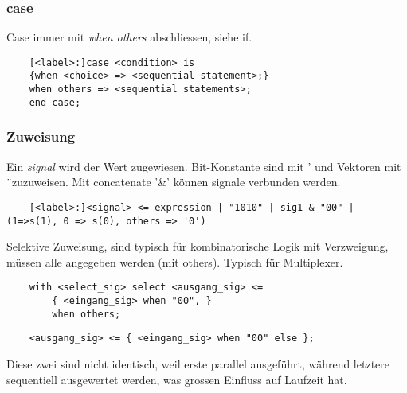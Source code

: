 \subsubsection{case}
Case immer mit \textit{when others} abschliessen, siehe if.
\begin{lstlisting}
	[<label>:]case <condition> is
	{when <choice> => <sequential statement>;}
	when others => <sequential statements>;
	end case;
\end{lstlisting}

\subsubsection{Zuweisung}
Ein \textit{signal} wird der Wert zugewiesen. Bit-Konstante sind mit ' und Vektoren mit \"\ zuzuweisen. Mit concatenate '\&' können signale verbunden werden. 
\begin{lstlisting}
	[<label>:]<signal> <= expression | "1010" | sig1 & "00" | (1=>s(1), 0 => s(0), others => '0') 
\end{lstlisting}
Selektive Zuweisung, sind typisch für kombinatorische Logik mit Verzweigung, müssen alle angegeben werden (mit others). Typisch für Multiplexer.
\begin{lstlisting}
	with <select_sig> select <ausgang_sig> <= 
		{ <eingang_sig> when "00", }
		when others;
\end{lstlisting}
\begin{lstlisting}
	<ausgang_sig> <= { <eingang_sig> when "00" else };
\end{lstlisting}
Diese zwei sind nicht identisch, weil erste parallel ausgeführt, während letztere sequentiell ausgewertet werden, was grossen Einfluss auf Laufzeit hat.
